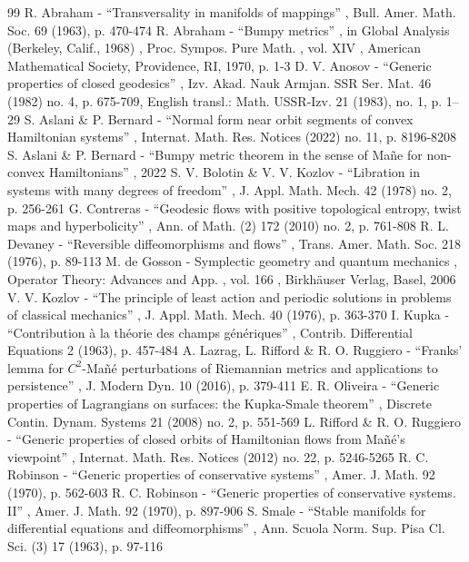 \begin{thebibliography}{99}
 R. Abraham - “Transversality in manifolds of mappings” , Bull. Amer. Math. Soc. 69 (1963), p. 470-474
 R. Abraham - “Bumpy metrics” , in Global Analysis (Berkeley, Calif., 1968) , Proc. Sympos. Pure Math. , vol. XIV , American Mathematical Society, Providence, RI, 1970, p. 1-3
 D. V. Anosov - “Generic properties of closed geodesics” , Izv. Akad. Nauk Armjan. SSR Ser. Mat. 46 (1982) no. 4, p. 675-709, English transl.: Math. USSR-Izv. 21 (1983), no. 1, p. 1–29
 S. Aslani \& P. Bernard - “Normal form near orbit segments of convex Hamiltonian systems” , Internat. Math. Res. Notices (2022) no. 11, p. 8196-8208
 S. Aslani \& P. Bernard - “Bumpy metric theorem in the sense of Mañe for non-convex Hamiltonians” , 2022
 S. V. Bolotin \& V. V. Kozlov - “Libration in systems with many degrees of freedom” , J. Appl. Math. Mech. 42 (1978) no. 2, p. 256-261
 G. Contreras - “Geodesic flows with positive topological entropy, twist maps and hyperbolicity” , Ann. of Math. (2) 172 (2010) no. 2, p. 761-808
 R. L. Devaney - “Reversible diffeomorphisms and flows” , Trans. Amer. Math. Soc. 218 (1976), p. 89-113
 M. de Gosson - Symplectic geometry and quantum mechanics , Operator Theory: Advances and App. , vol. 166 , Birkhäuser Verlag, Basel, 2006
 V. V. Kozlov - “The principle of least action and periodic solutions in problems of classical mechanics” , J. Appl. Math. Mech. 40 (1976), p. 363-370
 I. Kupka - “Contribution à la théorie des champs génériques” , Contrib. Differential Equations 2 (1963), p. 457-484
 A. Lazrag, L. Rifford \& R. O. Ruggiero - “Franks’ lemma for $C^2$-Mañé perturbations of Riemannian metrics and applications to persistence” , J. Modern Dyn. 10 (2016), p. 379-411
 E. R. Oliveira - “Generic properties of Lagrangians on surfaces: the Kupka-Smale theorem” , Discrete Contin. Dynam. Systems 21 (2008) no. 2, p. 551-569
 L. Rifford \& R. O. Ruggiero - “Generic properties of closed orbits of Hamiltonian flows from Mañé’s viewpoint” , Internat. Math. Res. Notices (2012) no. 22, p. 5246-5265
 R. C. Robinson - “Generic properties of conservative systems” , Amer. J. Math. 92 (1970), p. 562-603
 R. C. Robinson - “Generic properties of conservative systems. II” , Amer. J. Math. 92 (1970), p. 897-906
 S. Smale - “Stable manifolds for differential equations and diffeomorphisms” , Ann. Scuola Norm. Sup. Pisa Cl. Sci. (3) 17 (1963), p. 97-116
\end{thebibliography}
